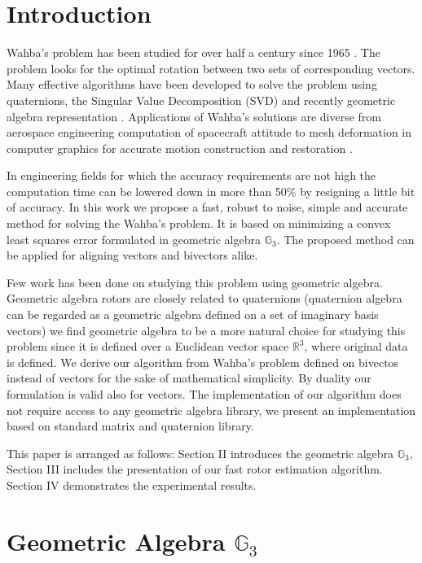 \documentclass{birkjour}
\numberwithin{equation}{section}
\begin{document}
\section{Introduction}

\indent Wahba's problem has been studied for over half a century since 1965 \cite{Wahba1965}. The problem looks for the optimal rotation between two sets of corresponding vectors. Many effective algorithms have been developed to solve the problem \cite{Arun1987, Horn1987, Mortari1996, Shuster1981, Wu2017, Yang2015} using quaternions, the Singular Value Decomposition (SVD) and recently geometric algebra representation \cite{Perwass2009, Dorst2011}. Applications of Wahba's solutions are diverse from aerospace engineering computation of spacecraft attitude \cite{Wu2017} to mesh deformation in computer graphics \cite{Sorkine2007, Sin2013} for accurate motion construction and restoration \cite{Nieto2012, Perwass2009}.

In engineering fields for which the accuracy requirements are not high the computation time can be lowered down in more than 50\% by resigning a little bit of accuracy. In this work we propose a fast, robust to noise, simple and accurate method for solving the Wahba's problem. It is based on minimizing a convex least squares error formulated in geometric algebra $\mathbb{G}_3$. The proposed method can be applied for aligning vectors and bivectors alike.

Few work has been done on studying this problem using geometric algebra. Geometric algebra rotors are closely related to quaternions (quaternion algebra can be regarded as a geometric algebra defined on a set of imaginary basis vectors) we find geometric algebra to be a more natural choice for studying this problem since it is defined over a Euclidean vector space $\mathbb R^3$, where original data is defined. We derive our algorithm from Wahba's problem defined on bivectos instead of vectors for the sake of mathematical simplicity. By duality our formulation is valid also for vectors. The implementation of our algorithm does not require access to any geometric algebra library, we present an implementation based on standard matrix and quaternion library. 

\indent This paper is arranged as follows: Section II introduces the geometric algebra $\mathbb{G}_3$, Section III includes the presentation of our fast rotor estimation algorithm. Section IV demonstrates the experimental results.

\section{Geometric Algebra $\mathbb{G}_3$}
\end{document}
